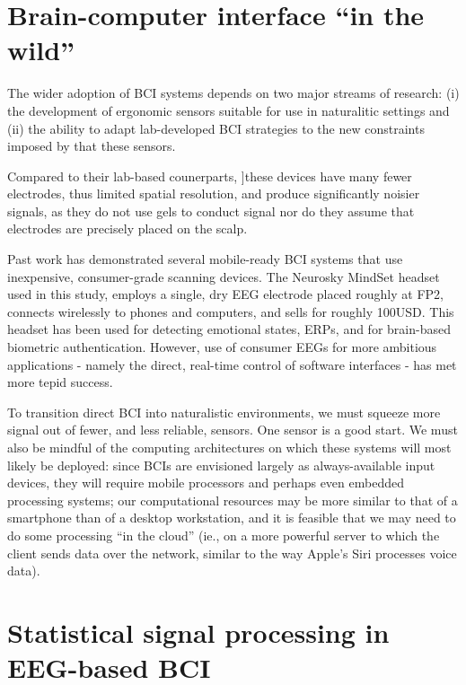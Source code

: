 
\section{Brain-computer interface ``in the wild''}
The wider adoption of BCI systems depends on two major streams of research: (i) the development of ergonomic sensors suitable for use in naturalitic settings and (ii) the ability to adapt lab-developed BCI strategies to the new constraints imposed by that these sensors.


Compared to their lab-based counerparts, ]these devices have many fewer electrodes, thus limited spatial resolution, and produce significantly noisier signals, as they do not use gels to conduct signal nor do they assume that electrodes are precisely placed on the scalp.


Past work has demonstrated several mobile-ready BCI systems that use inexpensive, consumer-grade scanning devices. \cite{campbell_neurophone:_2010} The Neurosky MindSet headset used in this study, employs a single, dry EEG electrode placed roughly at FP2, connects wirelessly to phones and computers, and sells for roughly 100USD. This headset has been used for detecting emotional states, ERPs, and for brain-based biometric authentication. \cite{crowley_evaluating_2010,grierson_better_2011,adams_i_2013} However, use of consumer EEGs for more ambitious applications - namely the direct, real-time control of software interfaces - has met more tepid success. \cite{carrino_self-paced_2012,larsen_classification_2011} 

To transition direct BCI into naturalistic environments, we must squeeze more signal out of fewer, and less reliable, sensors. One sensor is a good start. We must also be mindful of the computing architectures on which these systems will most likely be deployed: since BCIs are envisioned largely as always-available input devices, they will require mobile processors and perhaps even embedded processing systems; our computational resources may be more similar to that of a smartphone than of a desktop workstation, and it is feasible that we may need to do some processing ``in the cloud'' (ie., on a more powerful server to which the client sends data over the network, similar to the way Apple's Siri processes voice data). 

\section{Statistical signal processing in EEG-based BCI}

